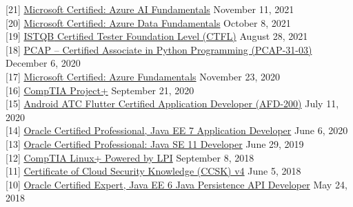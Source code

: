 \documentclass[10pt]{res} %
\begin{document}
\begin{resume}
{[21]} \phantom{0}\href{https://www.credly.com/badges/c6bfd90a-fd9b-4613-923e-989aa9199686}{\color{blue}Microsoft Certified: Azure AI Fundamentals} \hfill November 11, 2021 \\
{[20]} \phantom{0}\href{https://www.credly.com/badges/b2fad63d-a1f6-4b87-9bf6-d0084b7e2d5c}{\color{blue}Microsoft Certified: Azure Data Fundamentals} \hfill October 8, 2021 \\
{[19]} \phantom{0}\href{https://atsqa.org/certified-testers/profile/bc0a5e224de549a7a781cb663ac11cf4}{\color{blue}ISTQB\textsuperscript{\textregistered} Certified Tester Foundation Level (CTFL)} \hfill August 28, 2021 \\
{[18]} \phantom{0}\href{https://www.credly.com/badges/cf6bc3b9-f64a-442e-a684-dd5c3f6e293c}{\color{blue}PCAP -- Certified Associate in Python Programming (PCAP-31-03)} \hfill December 6, 2020 \\
{[17]} \phantom{0}\href{https://www.credly.com/badges/e58762be-37be-4b46-81f0-48f9e3a1d73a}{\color{blue} Microsoft Certified: Azure Fundamentals} \hfill November 23, 2020 \\
{[16]} \phantom{0}\href{https://www.credly.com/badges/1fc2bafb-f80b-48cf-bfe4-d9cb628a1890}{\color{blue}CompTIA Project+} \hfill September 21, 2020 \\
{[15]} \phantom{0}\href{https://androidatc.com/_transcript.php?action=public&u=ksuc1NfjztZglJacwtHW5%2Bmpy5%2BRmpyP0dPf}{\color{blue}Android ATC Flutter Certified Application Developer (AFD-200)} \hfill July 11, 2020 \\
{[14]} \phantom{0}\href{https://catalog-education.oracle.com/pls/certview/sharebadge?id=33DEF327B111F24D95D1A5B625A52671A4177D1A33340C48A11FAA939F272BC2}{\color{blue}Oracle Certified Professional, Java EE 7 Application Developer} \hfill June 6, 2020 \\
{[13]} \phantom{0}\href{https://catalog-education.oracle.com/pls/certview/sharebadge?id=6EEFFDDE0F96A660F5E7E359162CE8EDBA41D9B7B81F68EB07034B124808B530}{\color{blue}Oracle Certified Professional: Java SE 11 Developer} \hfill June 29, 2019 \\
{[12]} \phantom{0}\href{https://www.credly.com/badges/59cc6774-34fe-4871-a224-a8c2c8e0c65d}{\color{blue}CompTIA Linux+ Powered by LPI} \hfill September 8, 2018 \\
{[11]} \phantom{0}\href{https://www.credly.com/badges/c4afe593-650a-4092-9e60-75dedf5e7a6c}{\color{blue}Certificate of Cloud Security Knowledge (CCSK) v4} \hfill June 5, 2018 \\
{[10]} \phantom{0}\href{https://www.credly.com/badges/2c006bcd-5e96-4ed1-94fc-2228f8c5e5d0}{\color{blue}Oracle Certified Expert, Java EE 6 Java Persistence API Developer} \hfill May 24, 2018 \\

\end{resume}
\end{document}
